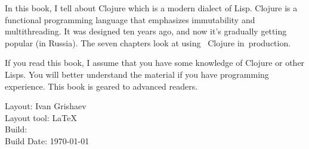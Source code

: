 \thispagestyle{empty}

In this book, I tell about Clojure which is a modern dialect of Lisp.
Clojure is a functional programming  language that emphasizes immutability and multithreading.
It was designed ten years ago, and now it's gradually getting popular (in Russia).
The seven chapters look at using ~Clojure in~production.


If you read this book, I assume that you have some knowledge of Clojure or other Lisps.
You will better understand the material if you have programming experience. This book is geared to advanced readers.

\vspace{5em}

\noindent
Layout: Ivan Grishaev\\
Layout tool: \LaTeX\\
Build: \COMMITHASH\xspace \COMMITTS\\
Build Date: \today
